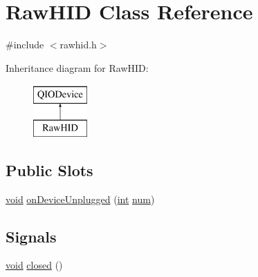 \hypertarget{class_raw_h_i_d}{\section{Raw\-H\-I\-D Class Reference}
\label{class_raw_h_i_d}
}


{\ttfamily \#include $<$rawhid.\-h$>$}

Inheritance diagram for Raw\-H\-I\-D\-:\begin{figure}[H]
\begin{center}
\leavevmode
\includegraphics[height=2.000000cm]{class_raw_h_i_d}
\end{center}
\end{figure}
\subsection*{Public Slots}
\begin{DoxyCompactItemize}
\item 
\hyperlink{group___u_a_v_objects_plugin_ga444cf2ff3f0ecbe028adce838d373f5c}{void} \hyperlink{group___raw_h_i_d_plugin_ga62bfd16ef26f8f8e8c52ce836b268c71}{on\-Device\-Unplugged} (\hyperlink{ioapi_8h_a787fa3cf048117ba7123753c1e74fcd6}{int} \hyperlink{glext_8h_abb50fc1ead3a02a46fb52daa2045f95c}{num})
\end{DoxyCompactItemize}
\subsection*{Signals}
\begin{DoxyCompactItemize}
\item 
\hyperlink{group___u_a_v_objects_plugin_ga444cf2ff3f0ecbe028adce838d373f5c}{void} \hyperlink{group___raw_h_i_d_plugin_ga4ababcef71544d260177e4957426598c}{closed} ()
\end{DoxyCompactItemize}
